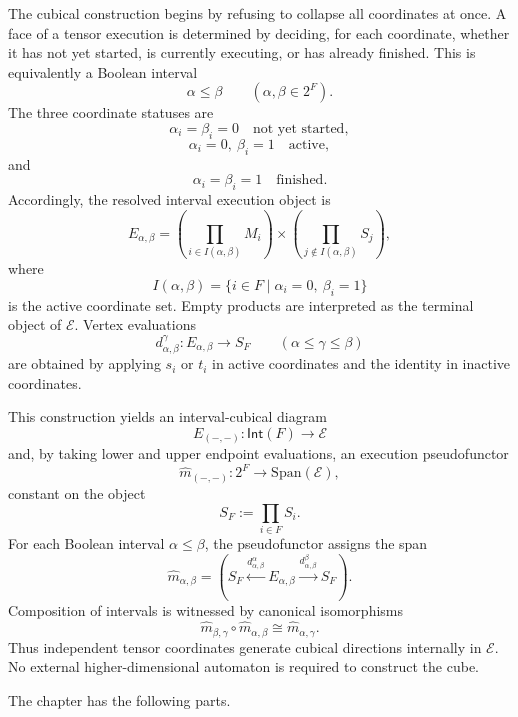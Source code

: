 The cubical construction begins by refusing to collapse all coordinates at
once. A face of a tensor execution is determined by deciding, for each
coordinate, whether it has not yet started, is currently executing, or has
already finished. This is equivalently a Boolean interval
\[
    \alpha\leq\beta
    \qquad
    (\alpha,\beta\in 2^F).
\]
The three coordinate statuses are
\[
    \alpha_i=\beta_i=0
    \quad\text{not yet started},
\]
\[
    \alpha_i=0,\ \beta_i=1
    \quad\text{active},
\]
and
\[
    \alpha_i=\beta_i=1
    \quad\text{finished}.
\]
Accordingly, the resolved interval execution object is
\[
    E_{\alpha,\beta}
    =
    \left(\prod_{i\in I(\alpha,\beta)}M_i\right)
    \times
    \left(\prod_{j\notin I(\alpha,\beta)}S_j\right),
\]
where
\[
    I(\alpha,\beta)=\{i\in F\mid \alpha_i=0,\ \beta_i=1\}
\]
is the active coordinate set. Empty products are interpreted as the terminal
object of \(\mathcal E\). Vertex evaluations
\[
    d_{\alpha,\beta}^{\gamma}:E_{\alpha,\beta}\to S_F
    \qquad
    (\alpha\leq\gamma\leq\beta)
\]
are obtained by applying \(s_i\) or \(t_i\) in active coordinates and the
identity in inactive coordinates.

This construction yields an interval-cubical diagram
\[
    E_{(-,-)}:\mathsf{Int}(F)\to\mathcal E
\]
and, by taking lower and upper endpoint evaluations, an execution
pseudofunctor
\[
    \widehat m_{(-,-)}:2^F\longrightarrow \mathrm{Span}(\mathcal E),
\]
constant on the object
\[
    S_F:=\prod_{i\in F}S_i.
\]
For each Boolean interval \(\alpha\leq\beta\), the pseudofunctor assigns the
span
\[
    \widehat m_{\alpha,\beta}
    =
    \left(
        S_F
        \xleftarrow{d_{\alpha,\beta}^{\alpha}}
        E_{\alpha,\beta}
        \xrightarrow{d_{\alpha,\beta}^{\beta}}
        S_F
    \right).
\]
Composition of intervals is witnessed by canonical isomorphisms
\[
    \widehat m_{\beta,\gamma}\circ\widehat m_{\alpha,\beta}
    \cong
    \widehat m_{\alpha,\gamma}.
\]
Thus independent tensor coordinates generate cubical directions internally in
\(\mathcal E\). No external higher-dimensional automaton is required to
construct the cube.

The chapter has the following parts.

